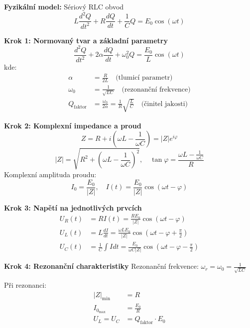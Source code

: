 \begin{example}
\label{ex:kompletni-rlc-obvod}

\noindent\textbf{Fyzikální model:} Sériový RLC obvod
\[
L\frac{d^2Q}{dt^2} + R\frac{dQ}{dt} + \frac{1}{C}Q = E_0\cos(\omega t)
\]

\vspace{1.5\baselineskip}

\noindent\textbf{Krok 1: Normovaný tvar a základní parametry}
\[
\frac{d^2Q}{dt^2} + 2\alpha\frac{dQ}{dt} + \omega_0^2 Q = \frac{E_0}{L}\cos(\omega t)
\]
kde:
\begin{align*}
\alpha &= \frac{R}{2L} \quad \text{(tlumicí parametr)} \\
\omega_0 &= \frac{1}{\sqrt{LC}} \quad \text{(rezonanční frekvence)} \\
Q_{\text{faktor}} &= \frac{\omega_0}{2\alpha} = \frac{1}{R}\sqrt{\frac{L}{C}} \quad \text{(činitel jakosti)}
\end{align*}

\vspace{1\baselineskip}

\noindent\textbf{Krok 2: Komplexní impedance a proud}
\[
Z = R + i\left(\omega L - \frac{1}{\omega C}\right) = |Z|e^{i\varphi}
\]
\[
|Z| = \sqrt{R^2 + \left(\omega L - \frac{1}{\omega C}\right)^2}, \quad \tan\varphi = \frac{\omega L - \frac{1}{\omega C}}{R}
\]
Komplexní amplituda proudu:
\[
I_0 = \frac{E_0}{|Z|}, \quad I(t) = \frac{E_0}{|Z|}\cos(\omega t - \varphi)
\]

\vspace{1\baselineskip}

\noindent\textbf{Krok 3: Napětí na jednotlivých prvcích}
\begin{align*}
U_R(t) &= RI(t) = \frac{RE_0}{|Z|}\cos(\omega t - \varphi) \\
U_L(t) &= L\frac{dI}{dt} = \frac{\omega LE_0}{|Z|}\cos\left(\omega t - \varphi + \frac{\pi}{2}\right) \\
U_C(t) &= \frac{1}{C}\int I dt = \frac{E_0}{\omega C|Z|}\cos\left(\omega t - \varphi - \frac{\pi}{2}\right)
\end{align*}

\vspace{1\baselineskip}

\noindent\textbf{Krok 4: Rezonanční charakteristiky}
Rezonanční frekvence: $\omega_r = \omega_0 = \frac{1}{\sqrt{LC}}$

Při rezonanci:
\begin{align*}
|Z|_{\text{min}} &= R \\
I_0_{\text{max}} &= \frac{E_0}{R} \\
U_L = U_C &= Q_{\text{faktor}} \cdot E_0
\end{align*}


\end{example}
